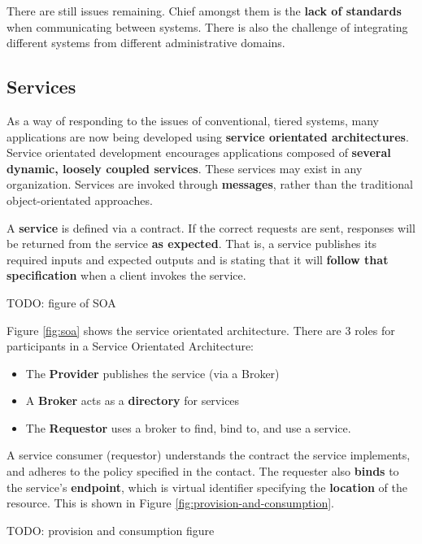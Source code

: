 \documentclass{article}
\begin{document}
There are still issues remaining. Chief amongst them is the \textbf{lack of standards} when communicating between systems. There is also the challenge of integrating different systems from different administrative domains. 

\subsection{Services}

As a way of responding to the issues of conventional, tiered systems, many applications are now being developed using \textbf{service orientated architectures}. Service orientated development encourages applications composed of \textbf{several dynamic, loosely coupled services}. These services may exist in any organization. Services are invoked through \textbf{messages}, rather than the traditional object-orientated approaches.

A \textbf{service} is defined via a contract. If the correct requests are sent, responses will be returned from the service \textbf{as expected}. That is, a service publishes its required inputs and expected outputs and is stating that it will \textbf{follow that specification} when a client invokes the service.

TODO: figure of SOA

Figure \ref{fig:soa} shows the service orientated architecture. There are 3 roles for participants in a Service Orientated Architecture:
\begin{itemize}
    \item The \textbf{Provider} publishes the service (via a Broker)
    \item A \textbf{Broker} acts as a \textbf{directory} for services
    \item The \textbf{Requestor} uses a broker to find, bind to, and use a service.
\end{itemize}

A service consumer (requestor) understands the contract the service implements, and adheres to the policy specified in the contact. The requester also \textbf{binds} to the service's \textbf{endpoint}, which is virtual identifier specifying the \textbf{location} of the resource. This is shown in Figure \ref{fig:provision-and-consumption}.

TODO: provision and consumption figure 
\end{document}
